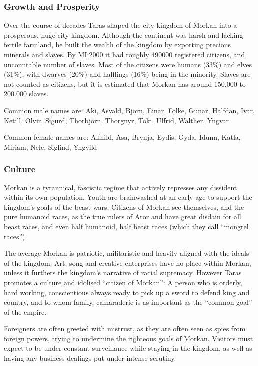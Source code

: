 \subsubsection{Growth and Prosperity}

Over the course of decades Taras shaped the city kingdom of Morkan into a
prosperous, huge city kingdom. Although the continent was harsh and lacking
fertile farmland, he built the wealth of the kingdom by exporting precious
minerals and slaves. By MI:2000 it had roughly 490000 registered citizens, and
uncountable number of slaves. Most of the citizens were humans (33\%) and
elves (31\%), with dwarves (20\%) and halflings (16\%) being in the
minority. Slaves are not counted as citizens, but it is estimated that Morkan
has around 150.000 to 200.000 slaves.

Common male names are: Aki, Asvald, Björn, Einar, Folke, Gunar, Halfdan, Ivar,
Ketill, Olvir, Sigurd, Thorbjörn, Thorgnyr, Toki, Ulfrid, Walther, Yngvar

Common female names are: Alfhild, Asa, Brynja, Eydis, Gyda, Idunn, Katla,
Miriam, Nele, Siglind, Yngvild

\subsubsection{Culture}

Morkan is a tyrannical, fascistic regime that actively represses any dissident
within its own population. Youth are brainwashed at an early age to support
the kingdom's goals of the beast wars. Citizens of Morkan see themselves, and
the pure humanoid races, as the true rulers of Aror and have great disdain for
all beast races, and even half humanoid, half beast races (which they call
``mongrel races'').

The average Morkan is patriotic, militaristic and heavily aligned with the
ideals of the kingdom. Art, song and creative enterprises have no place within
Morkan, unless it furthers the kingdom's narrative of racial supremacy. However
Taras promotes a culture and idolised ``citizen of Morkan'': A person who is
orderly, hard working, conscientious always ready to pick up a sword to defend
king and country, and to whom family, camaraderie is as important as the
``common goal'' of the empire.

Foreigners are often greeted with mistrust, as they are often seen as spies
from foreign powers, trying to undermine the righteous goals of Morkan.
Visitors must expect to be under constant surveillance while staying in the
kingdom, as well as having any business dealings put under intense scrutiny.

